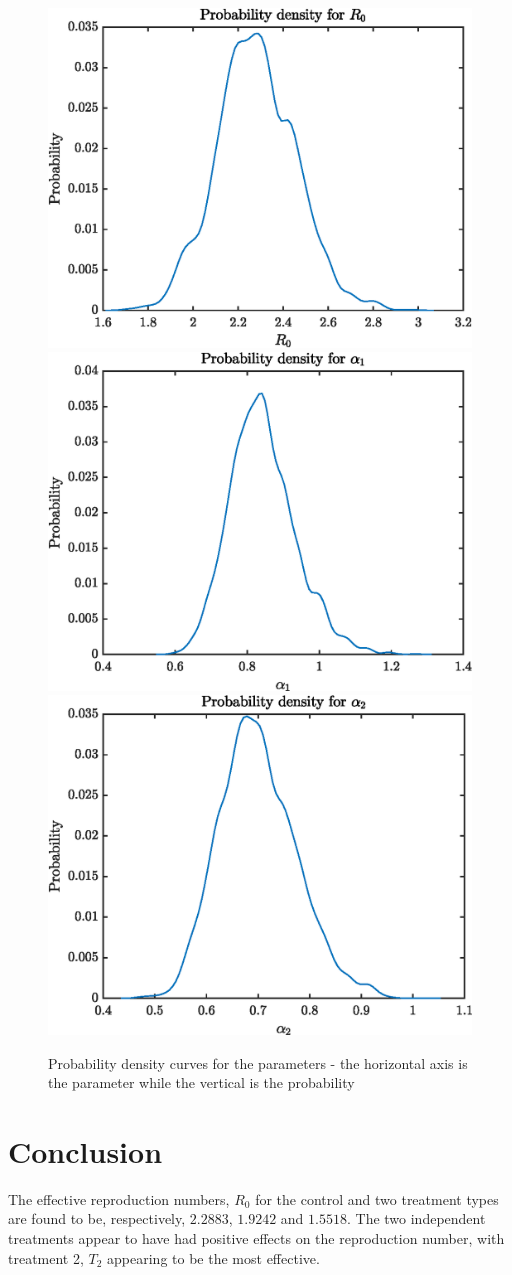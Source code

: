 \documentclass{X:/Documents/Coding/Latex/myassignment}
\begin{document}
\begin{figure}[tbh]
	\centering
	\includegraphics[width=0.45\linewidth]{Probdensity1.eps}
	\includegraphics[width=0.45\linewidth]{Probdensity2.eps}
	\includegraphics[width=0.45\linewidth]{Probdensity3.eps}
	\caption{Probability density curves for the parameters - the horizontal axis is the parameter while the vertical is the probability}
	\label{fig:density}
\end{figure}




\section{Conclusion}

The effective reproduction numbers, $R_0$ for the control and two treatment types are found to be, respectively, $2.2883$, $1.9242$ and $1.5518$. The two independent treatments appear to have had positive effects on the reproduction number, with treatment 2, $T_2$ appearing to be the most effective. 
\end{document}

